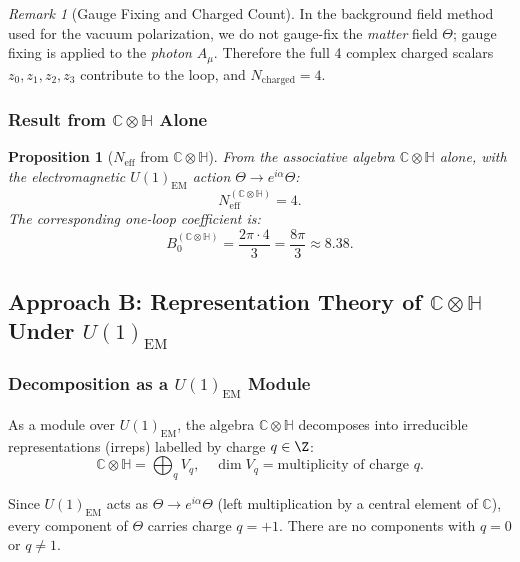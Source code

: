 \documentclass[11pt,a4paper]{article}
\newcommand{\C}{\mathbb{C}}
\renewcommand{\H}{\mathbb{H}}
\newtheorem{proposition}[theorem]{Proposition}
\theoremstyle{remark}
\newtheorem{remark}{Remark}
\begin{document}
\begin{remark}[Gauge Fixing and Charged Count]
In the background field method used for the vacuum polarization, we do not gauge-fix the
\emph{matter} field $\Theta$; gauge fixing is applied to the \emph{photon} $A_\mu$.
Therefore the full 4 complex charged scalars $z_0, z_1, z_2, z_3$ contribute to the loop,
and $N_{\mathrm{charged}} = 4$.
\end{remark}

\subsubsection{Result from $\C\otimes\H$ Alone}

\begin{proposition}[$N_{\mathrm{eff}}$ from $\C\otimes\H$]
\label{prop:Neff_CxH}
From the associative algebra $\C\otimes\H$ alone, with the electromagnetic $U(1)_{\mathrm{EM}}$
action $\Theta \to e^{i\alpha}\Theta$:
\begin{equation}
  N_{\mathrm{eff}}^{(\C\otimes\H)} = 4.
  \label{eq:Neff_CxH}
\end{equation}
The corresponding one-loop coefficient is:
\begin{equation}
  B_0^{(\C\otimes\H)} = \frac{2\pi \cdot 4}{3} = \frac{8\pi}{3} \approx 8.38.
  \label{eq:B0_CxH}
\end{equation}
\end{proposition}

\subsection{Approach B: Representation Theory of $\C\otimes\H$ Under $U(1)_{\mathrm{EM}}$}

\subsubsection{Decomposition as a $U(1)_{\mathrm{EM}}$ Module}

As a module over $U(1)_{\mathrm{EM}}$, the algebra $\C\otimes\H$ decomposes into irreducible
representations (irreps) labelled by charge $q \in \Z$:
\begin{equation}
  \C\otimes\H = \bigoplus_{q} V_q, \quad \dim V_q = \text{multiplicity of charge } q.
\end{equation}

Since $U(1)_{\mathrm{EM}}$ acts as $\Theta \to e^{i\alpha}\Theta$ (left multiplication by a
central element of $\C$), every component of $\Theta$ carries charge $q = +1$.
There are no components with $q = 0$ or $q \neq 1$.
\end{document}
